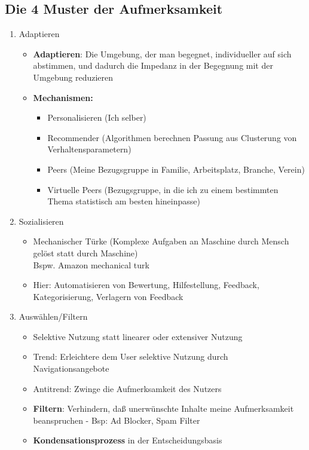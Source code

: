 \documentclass{article} %
\begin{document}
	\subsection{Die 4 Muster der Aufmerksamkeit}
	\begin{enumerate}
		\item Adaptieren
		\begin{itemize}
			\item \textbf{Adaptieren}: Die Umgebung, der man begegnet, individueller auf sich abstimmen, und dadurch die Impedanz in der Begegnung mit der Umgebung reduzieren
			\item \textbf{Mechanismen:}
			\begin{itemize}
				\item Personalisieren (Ich selber)
				\item Recommender (Algorithmen berechnen Passung aus Clusterung von Verhaltensparametern)
				\item Peers (Meine Bezugsgruppe in Familie, Arbeitsplatz, Branche, Verein)
				\item Virtuelle Peers (Bezugsgruppe, in die ich zu einem bestimmten Thema statistisch am besten hineinpasse)
			\end{itemize}
		\end{itemize}
		\item Sozialisieren
		\begin{itemize}
			\item Mechanischer Türke (Komplexe Aufgaben an Maschine durch Mensch gelöst statt durch Maschine)\\
			Bspw. Amazon mechanical turk
			\item Hier: Automatisieren von Bewertung, Hilfestellung, Feedback, Kategorisierung, Verlagern von Feedback
		\end{itemize}
		\item Auswählen/Filtern
		\begin{itemize}
			\item Selektive Nutzung statt linearer oder extensiver Nutzung
			\item Trend: Erleichtere dem User selektive Nutzung durch Navigationsangebote
			\item Antitrend: Zwinge die Aufmerksamkeit des Nutzers
			\item \textbf{Filtern}: Verhindern, daß unerwünschte Inhalte meine Aufmerksamkeit beanspruchen - Bsp: Ad Blocker, Spam Filter
			\item \textbf{Kondensationsprozess} in der Entscheidungsbasis
			\begin{itemize}

\end{itemize}
\end{itemize}
\end{enumerate}
\end{document}
